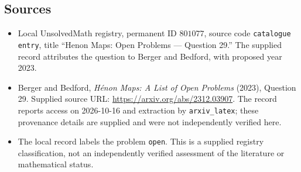 \documentclass[11pt]{article}
\begin{document}
\subsection{Sources}
\begin{itemize}
\item Local UnsolvedMath registry, permanent ID \(801077\), source code \texttt{catalogue entry}, title ``Henon Maps: Open Problems --- Question 29.'' The supplied record attributes the question to Berger and Bedford, with proposed year 2023.
\item Berger and Bedford, \emph{H\'enon Maps: A List of Open Problems} (2023), Question 29. Supplied source URL: \url{https://arxiv.org/abs/2312.03907}. The record reports access on 2026-10-16 and extraction by \texttt{arxiv\_latex}; these provenance details are supplied and were not independently verified here.
\item The local record labels the problem \texttt{open}. This is a supplied registry classification, not an independently verified assessment of the literature or mathematical status.
\end{itemize}
\end{document}
